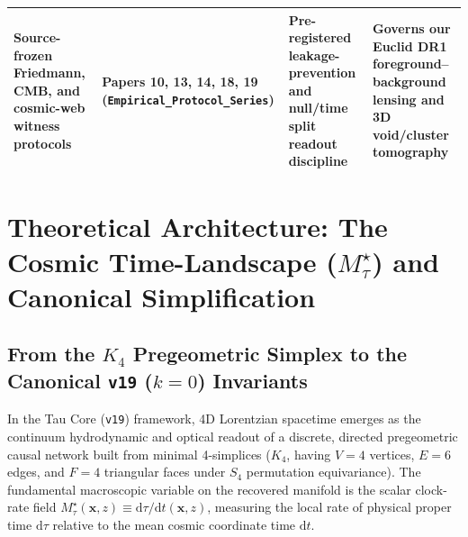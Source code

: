 \documentclass[11pt,a4paper]{article}
\begin{document}
\begin{table}[H]
{\begin{tabular}{L{3.5cm}L{3.1cm}L{4.3cm}L{4.3cm}}
\addlinespace[3pt]
Source-frozen Friedmann, CMB, and cosmic-web witness protocols & \textbf{Papers 10, 13, 14, 18, 19} (\texttt{Empirical\_\allowbreak Protocol\_\allowbreak Series}) & Pre-registered leakage-prevention and null/time split readout discipline & Governs our Euclid DR1 foreground--background lensing and 3D void/cluster tomography \\
\bottomrule
\end{tabular}%
}
\end{table}

\newpage
\section{Theoretical Architecture: The Cosmic Time-Landscape (\texorpdfstring{$M_\tau^\star$}{M\_tau*}) and Canonical Simplification}

\subsection{From the \texorpdfstring{$K_4$}{K4} Pregeometric Simplex to the Canonical \texorpdfstring{\texttt{v19} ($k = 0$)}{v19 (k = 0)} Invariants}

In the Tau Core (\texttt{v19}) framework, 4D Lorentzian spacetime emerges as the continuum hydrodynamic and optical readout of a discrete, directed pregeometric causal network built from minimal 4-simplices ($K_4$, having $V = 4$ vertices, $E = 6$ edges, and $F = 4$ triangular faces under $S_4$ permutation equivariance). The fundamental macroscopic variable on the recovered manifold is the scalar clock-rate field $M_\tau^\star(\mathbf{x}, z) \equiv \mathrm{d}\tau/\mathrm{d}t(\mathbf{x}, z)$, measuring the local rate of physical proper time $\mathrm{d}\tau$ relative to the mean cosmic coordinate time $\mathrm{d}t$.
\end{document}
